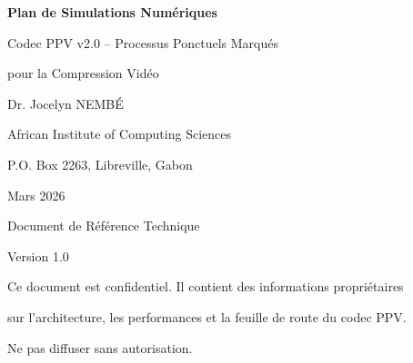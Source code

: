 \documentclass[12pt,a4paper]{article}
\begin{document}
	
	\begin{titlepage}
		\centering
		{\Huge\bfseries Plan de Simulations Numériques\par}
		\vspace{1.5cm}
		{\Large Codec PPV v2.0 -- Processus Ponctuels Marqués\par}
		\vspace{1cm}
		{\large pour la Compression Vidéo\par}
		\vspace{2cm}
		{\large Dr. Jocelyn NEMBÉ\par}
		{\large African Institute of Computing Sciences\par}
		{\large P.O. Box 2263, Libreville, Gabon\par}
		\vspace{1cm}
		{\large Mars 2026\par}
		\vspace{2cm}
		{\large Document de Référence Technique\par}
		{\large Version 1.0\par}
		\vfill
		{\small Ce document est confidentiel. Il contient des informations propriétaires\par}
		{\small sur l'architecture, les performances et la feuille de route du codec PPV.\par}
		{\small Ne pas diffuser sans autorisation.\par}
	\end{titlepage}
	
	\begin{abstract}
		\noindent Ce document présente le plan complet de simulations numériques pour valider l'architecture du codec PPV v2.0 basé sur les processus ponctuels marqués. L'objectif est de tester expérimentalement les 4 cadres statistiques (Vecteur, Marqué, Spatial, Markovien), les procédures d'estimation d'intensité par fonctions de base, et les bornes de convergence théoriques. Le plan couvre la génération de données synthétiques (Poisson homogène et non homogène), l'estimation MDL palier par palier, le calcul des longueurs de code (L₁-L₄ et MDL), et la validation des bornes de convergence en distance de Hellinger. Les simulations permettront d'établir les seuils de décision optimaux pour l'arbre de décision hiérarchique et de quantifier les gains de compression attendus sur des blocs vidéo réels.
		
		\medskip
		\noindent \textbf{Mots-clés :} Processus ponctuels, Codage MDL, Compression vidéo, Estimation d'intensité, Distance de Hellinger, Simulation Monte-Carlo.
		
		\medskip
		\noindent \textbf{Codes AMS :} 60G55; 62G05; 62G20; 62E25; 94A29.
	\end{abstract}
	
\end{document}
